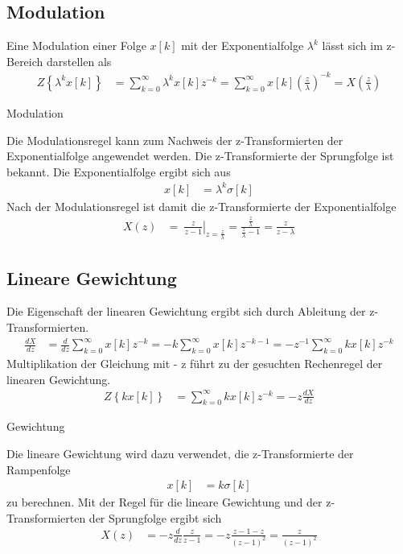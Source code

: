 \subsection{Modulation}\label{sec:modulation}

Eine Modulation einer Folge \(x[k]\) mit der Exponentialfolge \(λ^{k}\) lässt sich im z-Bereich darstellen als
\begin{align}
Z\left\{ \lambda^{k}  x[ k] \right\} &= \sum\limits_{k = 0}^{\infty}{\lambda^{k}  x[ k]  z^{- k}} = \sum\limits_{k = 0}^{\infty}{x[ k]  \left( \frac{z}{\lambda} \right)^{- k}} = X\left( \frac{z}{\lambda} \right) \label{eq:5.51}
\end{align}
\begin{example}{Modulation}
\label{example:beispiel-modulation}

Die Modulationsregel kann zum Nachweis der z-Transformierten der Exponentialfolge angewendet werden. Die z-Transformierte der Sprungfolge ist bekannt. Die Exponentialfolge ergibt sich aus
\begin{align*}
x[ k] &= \lambda^{k}  \sigma[ k] 
\end{align*}
Nach der Modulationsregel ist damit die z-Transformierte der Exponentialfolge
\begin{align*}
X(z) &= \left. \ \frac{z}{z - 1} \right|_{z = \frac{z}{\lambda}} = \frac{\frac{z}{\lambda}}{\frac{z}{\lambda} - 1} = \frac{z}{z - \lambda} 
\end{align*}
\end{example}

\subsection{Lineare Gewichtung}\label{sec:lineare-gewichtung}

Die Eigenschaft der linearen Gewichtung ergibt sich durch Ableitung der z-Transformierten.
\begin{align}
\frac{dX}{dz} &= \frac{d}{dz}\sum\limits_{k = 0}^{\infty}{x[ k]  z^{- k}} = - k  \sum\limits_{k = 0}^{\infty}{x[ k]  z^{- k - 1}} = - z^{- 1}  \sum\limits_{k = 0}^{\infty}{k  x[ k]  z^{- k}} \label{eq:5.54}
\end{align}
Multiplikation der Gleichung mit - z führt zu der gesuchten Rechenregel der linearen Gewichtung.
\begin{align}
Z\left\{ k  x[ k] \right\} &= \sum\limits_{k = 0}^{\infty}{k  x[ k]  z^{- k}} = - z  \frac{dX}{dz} \label{eq:5.55}
\end{align}
\begin{example}{Gewichtung}
\label{example:beispiel-gewichtung}

Die lineare Gewichtung wird dazu verwendet, die z-Transformierte der Rampenfolge
\begin{align*}
x[ k] &= k  \sigma[ k] 
\end{align*}
zu berechnen. Mit der Regel für die lineare Gewichtung und der z-Transformierten der Sprungfolge ergibt sich
\begin{align*}
X(z) &= - z  \frac{d}{dz}\frac{z}{z - 1} = - z  \frac{z - 1 - z}{(z - 1)^{2}} = \frac{z}{(z - 1)^{2}} 
\end{align*}
\end{example}

